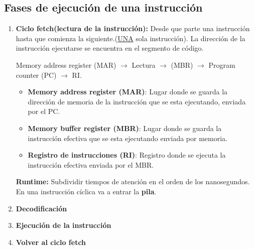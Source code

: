 \documentclass{templateNote}
\begin{document}
\subsection{Fases de ejecución de una instrucción}

\begin{enumerate}
    \item \textbf{Ciclo fetch(lectura de la instrucción):} Desde que parte una instrucción hasta que comienza la siguiente.(\underline{UNA} sola instrucción).
    La dirección de la instrucción  ejecutarse se encuentra en el segmento de código.
    
    Memory address register (MAR) $\rightarrow$ Lectura $\rightarrow$ (MBR) $\rightarrow$ Program counter (PC) $\rightarrow$ RI. 
    
    \begin{itemize}
        \item \textbf{Memory address register (MAR)}: Lugar donde se guarda la dirección de memoria de la instrucción que se esta ejecutando, enviada por el PC.
        \item \textbf{Memory buffer register (MBR)}: Lugar donde se guarda la instrucción efectiva que se esta ejecutando enviada por memoria.
        \item \textbf{Registro de instrucciones (RI)}: Registro donde se ejecuta la instrucción efectiva enviada por el MBR.
    \end{itemize}
    
    \begin{tcolorbox}[title=Recordar]
        \begin{center}
            \textbf{Runtime:} Subdividir tiempos de atención en el orden de los nanosegundos.\\
            En una instrucción cíclica va a entrar la \textbf{pila}.
        \end{center}
    \end{tcolorbox}
    \item \textbf{Decodificación}
    \item \textbf{Ejecución de la instrucción}
    \item \textbf{Volver al ciclo fetch
    } 
\end{enumerate}
\end{document}
